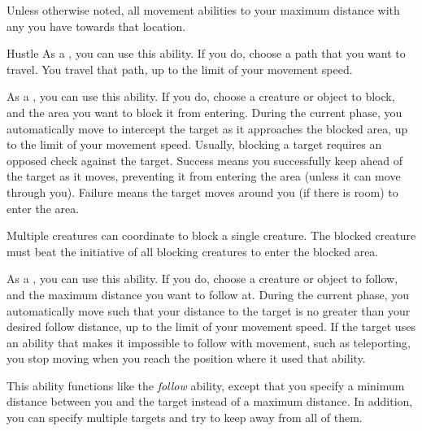         Unless otherwise noted, all movement abilities 
            to your maximum distance with any  you have towards that location.

        \begin{ability}{Hustle}
            As a , you can use this ability.
            If you do, choose a path that you want to travel.
            You travel that path, up to the limit of your movement speed.
        \end{ability}

        \begin{ability}{}
            As a , you can use this ability.
            If you do, choose a creature or object to block, and the area you want to block it from entering.
            During the current phase, you automatically move to intercept the target as it approaches the blocked area, up to the limit of your movement speed.
            Usually, blocking a target requires an opposed  check against the target.
            Success means you successfully keep ahead of the target as it moves, preventing it from entering the area (unless it can move through you).
            Failure means the target moves around you (if there is room) to enter the area.

            Multiple creatures can coordinate to block a single creature.
            The blocked creature must beat the initiative of all blocking creatures to enter the blocked area.
        \end{ability}

        \begin{ability}{}
            As a , you can use this ability.
            If you do, choose a creature or object to follow, and the maximum distance you want to follow at.
            During the current phase, you automatically move such that your distance to the target is no greater than your desired follow distance, up to the limit of your movement speed.
            If the target uses an ability that makes it impossible to follow with movement, such as teleporting, you stop moving when you reach the position where it used that ability.
        \end{ability}

        \begin{ability}{}
            This ability functions like the \textit{follow} ability, except that you specify a minimum distance between you and the target instead of a maximum distance.
            In addition, you can specify multiple targets and try to keep away from all of them.
        \end{ability}

